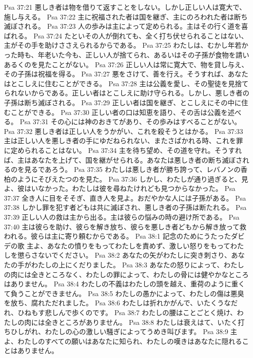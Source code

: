 Psa 37:21  悪しき者は物を借りて返すことをしない。しかし正しい人は寛大で、施し与える。
Psa 37:22  主に祝福された者は国を継ぎ、主にのろわれた者は断ち滅ぼされる。
Psa 37:23  人の歩みは主によって定められる。主はその行く道を喜ばれる。
Psa 37:24  たといその人が倒れても、全く打ち伏せられることはない、主がその手を助けささえられるからである。
Psa 37:25  わたしは、むかし年若かった時も、年老いた今も、正しい人が捨てられ、あるいはその子孫が食物を請いあるくのを見たことがない。
Psa 37:26  正しい人は常に寛大で、物を貸し与え、その子孫は祝福を得る。
Psa 37:27  悪をさけて、善を行え。そうすれば、あなたはとこしえに住むことができる。
Psa 37:28  主は公義を愛し、その聖徒を見捨てられないからである。正しい者はとこしえに助け守られる。しかし、悪しき者の子孫は断ち滅ぼされる。
Psa 37:29  正しい者は国を継ぎ、とこしえにその中に住むことができる。
Psa 37:30  正しい者の口は知恵を語り、その舌は公義を述べる。
Psa 37:31  その心には神のおきてがあり、その歩みはすべることがない。
Psa 37:32  悪しき者は正しい人をうかがい、これを殺そうとはかる。
Psa 37:33  主は正しい人を悪しき者の手にゆだねられない、またさばかれる時、これを罪に定められることはない。
Psa 37:34  主を待ち望め、その道を守れ。そうすれば、主はあなたを上げて、国を継がせられる。あなたは悪しき者の断ち滅ぼされるのを見るであろう。
Psa 37:35  わたしは悪しき者が勝ち誇って、レバノンの香柏のようにそびえたつのを見た。
Psa 37:36  しかし、わたしが通り過ぎると、見よ、彼はいなかった。わたしは彼を尋ねたけれども見つからなかった。
Psa 37:37  全き人に目をそそぎ、直き人を見よ。おだやかな人には子孫がある。
Psa 37:38  しかし罪を犯す者どもは共に滅ぼされ、悪しき者の子孫は断たれる。
Psa 37:39  正しい人の救は主から出る。主は彼らの悩みの時の避け所である。
Psa 37:40  主は彼らを助け、彼らを解き放ち、彼らを悪しき者どもから解き放って救われる。彼らは主に寄り頼むからである。
Psa 38:1  記念のためにうたったダビデの歌 主よ、あなたの憤りをもってわたしを責めず、激しい怒りをもってわたしを懲らさないでください。
Psa 38:2  あなたの矢がわたしに突き刺さり、あなたの手がわたしの上にくだりました。
Psa 38:3  あなたの怒りによって、わたしの肉には全きところなく、わたしの罪によって、わたしの骨には健やかなところはありません。
Psa 38:4  わたしの不義はわたしの頭を越え、重荷のように重くて負うことができません。
Psa 38:5  わたしの愚かによって、わたしの傷は悪臭を放ち、腐れただれました。
Psa 38:6  わたしは折れかがんで、いたくうなだれ、ひねもす悲しんで歩くのです。
Psa 38:7  わたしの腰はことごとく焼け、わたしの肉には全きところがありません。
Psa 38:8  わたしは衰えはて、いたく打ちひしがれ、わたしの心の激しい騒ぎによってうめき叫びます。
Psa 38:9  主よ、わたしのすべての願いはあなたに知られ、わたしの嘆きはあなたに隠れることはありません。
